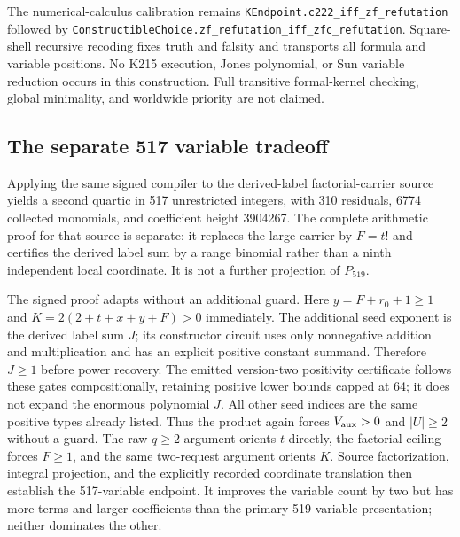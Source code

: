 The numerical-calculus calibration remains
\texttt{KEndpoint.c222\_iff\_zf\_refutation} followed by
\texttt{ConstructibleChoice.zf\_refutation\_iff\_zfc\_refutation}.
Square-shell recursive recoding fixes truth and falsity and transports
all formula and variable positions.  No K215 execution, Jones polynomial,
or Sun variable reduction occurs in this construction.  Full transitive
formal-kernel checking, global minimality, and worldwide priority are
not claimed.

\subsection{The separate 517 variable tradeoff}

Applying the same signed compiler to the derived-label factorial-carrier
source yields a second quartic in 517 unrestricted integers, with 310
residuals, 6774 collected monomials, and coefficient height 3904267.
The complete arithmetic proof for that source is separate: it replaces
the large carrier by $F=t!$ and certifies the derived label sum by a
range binomial rather than a ninth independent local coordinate.
It is not a further projection of $P_{519}$.

The signed proof adapts without an additional guard.  Here
$y=F+r_0+1\ge1$ and $K=2(2+t+x+y+F)>0$ immediately.  The additional
seed exponent is the derived label sum $J$; its constructor circuit
uses only nonnegative addition and multiplication and has an explicit
positive constant summand.  Therefore $J\ge1$ before power recovery.
The emitted version-two positivity certificate follows these gates
compositionally, retaining positive lower bounds capped at 64; it
does not expand the enormous polynomial $J$.  All other seed indices
are the same positive types already listed.  Thus the product again
forces $V_{\rm aux}>0$ and $|U|\ge2$ without a guard.  The raw $q\ge2$
argument orients $t$ directly, the factorial ceiling forces $F\ge1$,
and the same two-request argument orients $K$.  Source factorization,
integral projection, and the explicitly recorded coordinate translation
then establish the 517-variable endpoint.  It improves the variable
count by two but has more terms and larger coefficients than the
primary 519-variable presentation; neither dominates the other.
